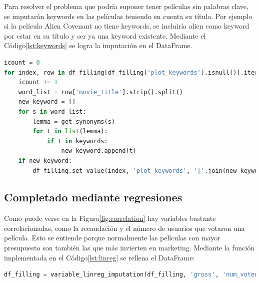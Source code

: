 Para resolver el problema que podría suponer tener películas sin palabras clave, se imputarán keywords en las películas teniendo en cuenta su título. Por ejemplo si la película Alien Covenant no tiene keywords, se incluiría alien como keyword por estar en su título y ser ya una keyword existente. Mediante el Código\ref{lst:keywords} se logra la imputación en el DataFrame.

\begin{lstlisting}[language=Python, caption=Imputación de keywords a partir del título de la película., label ={lst:keywords}]
icount = 0
for index, row in df_filling[df_filling['plot_keywords'].isnull()].iterrows():
    icount += 1
    word_list = row['movie_title'].strip().split()
    new_keyword = []
    for s in word_list:
        lemma = get_synonyms(s)
        for t in list(lemma):
            if t in keywords: 
                new_keyword.append(t)
    if new_keyword:
        df_filling.set_value(index, 'plot_keywords', '|'.join(new_keyword)) 
\end{lstlisting}

\subsection{Completado mediante regresiones}

Como puede verse en la Figura\ref{fig:correlation} hay variables bastante correlacionadas, como la recaudación y el número de usuarios que votaron una película. Esto se entiende porque normalmente las películas con mayor presupuesto son también las que más invierten en marketing. Mediante la función implementada en el Código\ref{lst:linreg} se rellena el DataFrame:

\begin{lstlisting}[language=Python, caption = Rellenado de la variable de presupuesto teniendo en cuenta el número de votos.]
df_filling = variable_linreg_imputation(df_filling, 'gross', 'num_voted_users')
\end{lstlisting}

